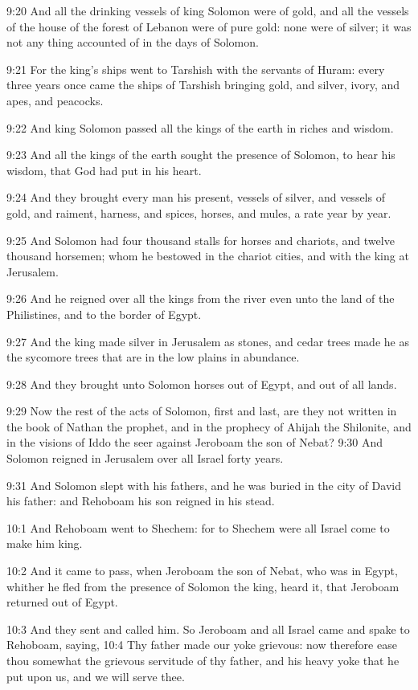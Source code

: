 9:20 And all the drinking vessels of king Solomon were of gold, and all the vessels of the house of the forest of Lebanon were of pure gold: none were of silver; it was not any thing accounted of in the days of Solomon.

9:21 For the king's ships went to Tarshish with the servants of Huram: every three years once came the ships of Tarshish bringing gold, and silver, ivory, and apes, and peacocks.

9:22 And king Solomon passed all the kings of the earth in riches and wisdom.

9:23 And all the kings of the earth sought the presence of Solomon, to hear his wisdom, that God had put in his heart.

9:24 And they brought every man his present, vessels of silver, and vessels of gold, and raiment, harness, and spices, horses, and mules, a rate year by year.

9:25 And Solomon had four thousand stalls for horses and chariots, and twelve thousand horsemen; whom he bestowed in the chariot cities, and with the king at Jerusalem.

9:26 And he reigned over all the kings from the river even unto the land of the Philistines, and to the border of Egypt.

9:27 And the king made silver in Jerusalem as stones, and cedar trees made he as the sycomore trees that are in the low plains in abundance.

9:28 And they brought unto Solomon horses out of Egypt, and out of all lands.

9:29 Now the rest of the acts of Solomon, first and last, are they not written in the book of Nathan the prophet, and in the prophecy of Ahijah the Shilonite, and in the visions of Iddo the seer against Jeroboam the son of Nebat?  9:30 And Solomon reigned in Jerusalem over all Israel forty years.

9:31 And Solomon slept with his fathers, and he was buried in the city of David his father: and Rehoboam his son reigned in his stead.

10:1 And Rehoboam went to Shechem: for to Shechem were all Israel come to make him king.

10:2 And it came to pass, when Jeroboam the son of Nebat, who was in Egypt, whither he fled from the presence of Solomon the king, heard it, that Jeroboam returned out of Egypt.

10:3 And they sent and called him. So Jeroboam and all Israel came and spake to Rehoboam, saying, 10:4 Thy father made our yoke grievous: now therefore ease thou somewhat the grievous servitude of thy father, and his heavy yoke that he put upon us, and we will serve thee.

